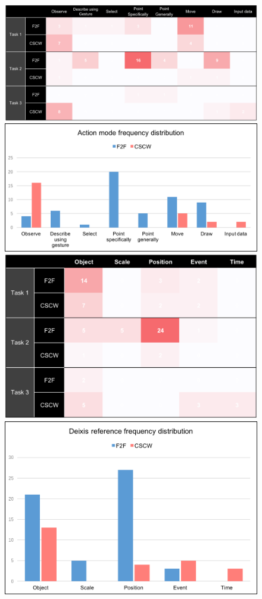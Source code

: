 \documentclass[12pt,twoside]{article}
\begin{document}
\begin{figure}
  \includegraphics[width=\linewidth]{img/action_mode_a.png}
  \includegraphics[width=\linewidth]{img/action_mode_b.png}
\endminipage\hfill
{}
  \includegraphics[width=\linewidth]{img/deixis_reference_a.png}
  \includegraphics[width=\linewidth]{img/deixis_reference_b.png}

\end{figure}
\end{document}
